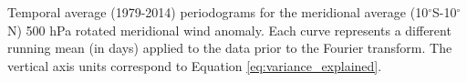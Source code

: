 \label{fig:periodogram}
Temporal average (1979-2014) periodograms for the meridional average (10$^{\circ}$S-10$^{\circ}$N) 500 hPa rotated meridional wind anomaly. Each curve represents a different running mean (in days) applied to the data prior to the Fourier transform. The vertical axis units correspond to Equation \ref{eq:variance_explained}.